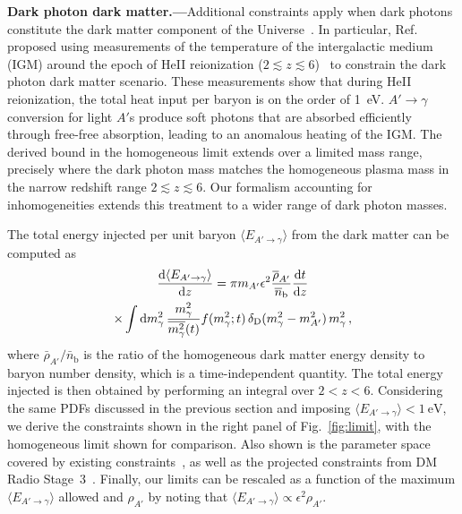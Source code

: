 \documentclass[prd,aps,10pt,nofootinbib,twocolumn,superscriptaddress,preprintnumbers,balancelastpage,longbibliography]{revtex4-1}
\begin{document}
\noindent
{\bf Dark photon dark matter.---}Additional constraints apply when dark photons constitute the dark matter component of the Universe~\cite{Redondo:2008ec,Arias:2012az, Agrawal:2018vin,Long:2019lwl,Co:2018lka}. In particular, Ref.~\cite{McDermott:2019lch} proposed using measurements of the temperature of the intergalactic medium (IGM) around the epoch of HeII reionization ($2 \lesssim z \lesssim 6$)~\cite{Becker:2010cu,Bolton:2013cba,Boera:2014sia,Rorai:2017qft,Hiss:2017qyw,Walther:2018pnn} to constrain the dark photon dark matter scenario. These measurements show that during HeII reionization, the total heat input per baryon is on the order of \SI{1}{\eV}. $A'\to\gamma$ conversion for light $A'$s produce soft photons that are absorbed efficiently through free-free absorption, leading to an anomalous heating of the IGM\@. The derived bound in the homogeneous limit extends over a limited mass range, precisely where the dark photon mass matches the homogeneous plasma mass in the narrow redshift range $2 \lesssim z \lesssim 6$. Our formalism accounting for inhomogeneities extends this treatment to a wider range of dark photon masses. 

The total energy injected per unit baryon $\langle E_{A' \to \gamma} \rangle$ from the dark matter can be computed as
%
\begin{multline}  \label{eq:prob_dm}
     \frac{\mathrm{d} \langle E_{A' \to \gamma} \rangle}{\mathrm{d} z} = \pi m_{A^\prime} \epsilon^2 \frac{\overline{\rho}_{A'}}{\overline{n}_{\mathrm{b}}} \frac{\mathrm{d} t}{\mathrm{d} z} \\ 
     \times \int \mathrm{d} m_\gamma^2 \, \frac{m_\gamma^2}{\overline{m_\gamma^2}(t)} f(m_\gamma^2;t) \, \delta_\mathrm{D}(m_\gamma^2 - m_{A^\prime}^2) \, m_\gamma^2   \,,
\end{multline}
%
where $\bar{\rho}_{A'} / \bar{n}_\mathrm{b}$ is the ratio of the homogeneous dark matter energy density to baryon number density, which is a time-independent quantity. The total energy injected is then obtained by performing an integral over $2 < z < 6$. Considering the same PDFs discussed in the previous section and imposing $\langle E_{A' \to \gamma} \rangle < \SI{1}{\eV}$, we derive the constraints shown in the right panel of Fig.~\ref{fig:limit}, with the homogeneous limit shown for comparison. Also shown is the parameter space covered by existing constraints~\cite{McDermott:2019lch,Wadekar:2019xnf}, as well as the projected constraints from DM Radio Stage~3~\cite{Chaudhuri:2014dla,Silva-Feaver:2016qhh,Battaglieri:2017aum}.  Finally, our limits can be rescaled as a function of the maximum $\langle E_{A' \to \gamma} \rangle$ allowed and $\rho_{A'}$ by noting that $\langle E_{A' \to \gamma} \rangle \propto \epsilon^2 \rho_{A'}$. 
\end{document}
